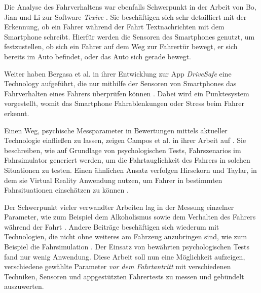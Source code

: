 Die Analyse des Fahrverhaltens war ebenfalls Schwerpunkt in der Arbeit von Bo, Jian und Li zur Software \textit{Texive} \cite{texive}. Sie beschäftigen sich sehr detailliert mit der Erkennung, ob ein Fahrer während der Fahrt Textnachrichten mit dem Smartphone schreibt. Hierfür werden die Sensoren des Smartphones genutzt, um festzustellen, ob sich ein Fahrer auf dem Weg zur Fahrertür bewegt, er sich bereits im Auto befindet, oder das Auto sich gerade bewegt.

Weiter haben Bergasa et al. in ihrer Entwicklung zur App \textit{DriveSafe} eine Technology aufgeführt, die nur mithilfe der Sensoren von Smartphones das Fahrverhalten eines Fahrers überprüfen können \cite{drivesafe}. Dabei wird ein Punktesystem vorgestellt, womit das Smartphone Fahrablenkungen oder Stress beim Fahrer erkennt.

Einen Weg, psychische Messparameter in Bewertungen mittels aktueller Technologie einfließen zu lassen, zeigen Campos et al. in ihrer Arbeit auf \cite{drivingsimulations}. Sie beschreiben, wie auf Grundlage von psychologischen Tests, Fahrszenarios im Fahrsimulator generiert werden, um die Fahrtauglichkeit des Fahrers in solchen Situationen zu testen. Einen ähnlichen Ansatz verfolgen Hirsekorn und Taylar, in dem sie Virtual Reality Anwendung nutzen, um Fahrer in bestimmten Fahrsituationen einschätzen zu können \cite{vrapplications}.

Der Schwerpunkt vieler verwandter Arbeiten lag in der Messung einzelner Parameter, wie zum Beispiel dem Alkoholismus \cite{mobilesmarttracking,sobrietymobiletests} sowie dem Verhalten des Fahrers während der Fahrt \cite{smartphoneresearchplatform, texive, drivesafe}. Andere Beiträge beschäftigen sich wiederum mit Technologien, die nicht ohne weiteres am Fahrzeug anzubringen sind, wie zum Beispiel die Fahrsimulation \cite{drivingsimulations, interaktivefahrsimulation, vrapplications}. Der Einsatz von bewährten psychologischen Tests fand nur wenig Anwendung. Diese Arbeit soll nun eine Möglichkeit aufzeigen, verschiedene gewählte Parameter \textit{vor dem Fahrtantritt} mit verschiedenen Techniken, Sensoren und appgestützten Fahrertests zu messen und gebündelt auszuwerten.
